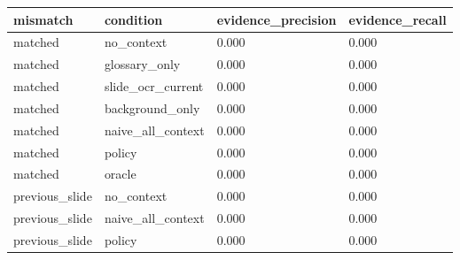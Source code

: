 \begin{tabular}{llll}
\toprule
mismatch & condition & evidence\_precision & evidence\_recall \\
\midrule
matched & no\_context & 0.000 & 0.000 \\
matched & glossary\_only & 0.000 & 0.000 \\
matched & slide\_ocr\_current & 0.000 & 0.000 \\
matched & background\_only & 0.000 & 0.000 \\
matched & naive\_all\_context & 0.000 & 0.000 \\
matched & policy & 0.000 & 0.000 \\
matched & oracle & 0.000 & 0.000 \\
previous\_slide & no\_context & 0.000 & 0.000 \\
previous\_slide & naive\_all\_context & 0.000 & 0.000 \\
previous\_slide & policy & 0.000 & 0.000 \\
\bottomrule
\end{tabular}
